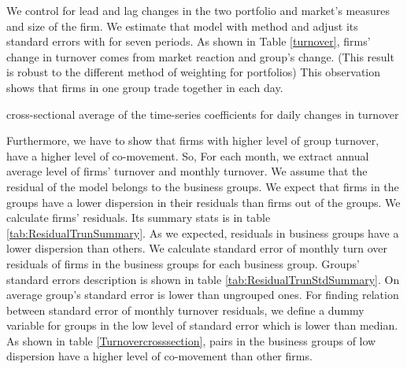 	
 We control for lead and lag changes in the two portfolio and market's measures and size of the firm. We estimate that model with \cite{FamaMacBeth} method and adjust its standard errors with \cite{newey1987hypothesis} for seven periods.  As shown in Table \ref{turnover}, firms' change in turnover comes from market reaction and group's change. (This result is robust to the different method of weighting for portfolios) This observation shows that firms in one group trade together in each day. 
{\begin{table}[htbp]
	\centering
	\caption{cross-sectional average of the time-series coefficients for daily changes in turnover }
	\resizebox{!}{!}{
		
	} \label{turnover}
\end{table}}



	\begin{table}[htbp]
		\centering
		\resizebox{\textwidth}{!}{
			\centering
			
		}
	\end{table}


	\begin{table}[htbp]
		\centering
		\resizebox{\textwidth}{!}{
			\centering
			
		}
	\end{table}




Furthermore, we have to show that firms with higher level of group turnover, have a higher level of co-movement. So, For each month, we extract annual average level of firms' turnover and monthly turnover. We assume that the residual of the model belongs to the business groups. We expect that firms in the groups have a lower dispersion in their residuals than firms out of the groups. We calculate firms' residuals. Its summary stats is in table \ref{tab:ResidualTrunSummary}. As we expected, residuals in business groups have a lower dispersion than others.
We calculate standard error of monthly turn over residuals of firms in the business groups for each business group. Groups' standard errors description is shown in table \ref{tab:ResidualTrunStdSummary}. On average group's standard error is lower than ungrouped  ones. For finding relation between standard error of monthly turnover residuals, we define a dummy variable for groups in the low level of standard error which is lower than median. As shown in table \ref{Turnovercrosssection}, pairs in the business groups of low dispersion have a higher level of co-movement than other firms.  


